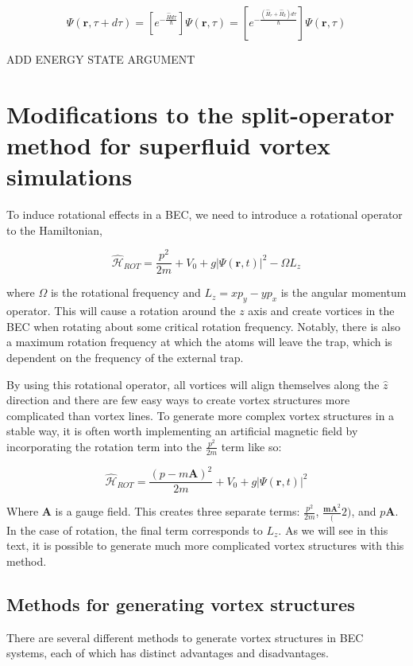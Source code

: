 $$
\Psi(\mathbf{r},\tau + d\tau) = \left[e^{-\frac{\hat{H}d\tau}{\hbar}}\right]\Psi(\mathbf{r},\tau) = \left[e^{-\frac{(\hat{H}_r + \hat{H}_k)d\tau}{\hbar}}\right]\Psi(\mathbf{r},\tau)
$$

ADD ENERGY STATE ARGUMENT

\section{Modifications to the split-operator method for superfluid vortex simulations}

To induce rotational effects in a BEC, we need to introduce a rotational operator to the Hamiltonian,

$$
\mathcal{\hat H}_{ROT} = \frac{p^2}{2m} + V_0 + g|\Psi(\mathbf{r},t)|^2 - \Omega L_z
$$

where $\Omega$ is the rotational frequency and $L_z = xp_y - yp_x$ is the angular momentum operator.
This will cause a rotation around the $z$ axis and create vortices in the BEC when rotating about some critical rotation frequency.
Notably, there is also a maximum rotation frequency at which the atoms will leave the trap, which is dependent on the frequency of the external trap.

By using this rotational operator, all vortices will align themselves along the $\hat z$ direction and there are few easy ways to create vortex structures more complicated than vortex lines.
To generate more complex vortex structures in a stable way, it is often worth implementing an artificial magnetic field by incorporating the rotation term into the $\frac{p^2}{2m}$ term like so:

$$
\mathcal{\hat H}_{ROT} = \frac{(p-m\mathbf{A})^2}{2m} + V_0 + g|\Psi(\mathbf{r},t)|^2
$$

Where $\mathbf{A}$ is a gauge field.
This creates three separate terms: $\frac{p^2}{2m}$, $\frac{\mathbf{mA}^2}(2)$, and $p\mathbf{A}$.
In the case of rotation, the final term corresponds to $L_z$.
As we will see in this text, it is possible to generate much more complicated vortex structures with this method.

\subsection{Methods for generating vortex structures}

There are several different methods to generate vortex structures in BEC systems, each of which has distinct advantages and disadvantages.

